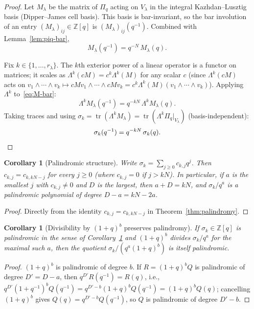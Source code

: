 \documentclass[11pt]{article}
\newtheorem{corollary}[theorem]{Corollary}
\theoremstyle{definition}
\newcommand{\Pq}{\Pi_q}
\newcommand{\Z}{\mathbb{Z}}
\newcommand{\tr}{\operatorname{tr}}
\begin{document}
\begin{proof}
Let $M_\lambda$ be the matrix of $\Pq$ acting on $V_\lambda$ in the
integral Kazhdan--Lusztig basis (Dipper--James cell basis). This basis
is bar-invariant, so the bar involution of an entry
$(M_\lambda)_{ij}\in\Z[q]$ is $(M_\lambda)_{ij}(q^{-1})$. Combined with
Lemma~\ref{lem:piq-bar},
\begin{equation}\label{eq:M-bar}
  M_\lambda(q^{-1}) = q^{-N}\,M_\lambda(q).
\end{equation}

Fix $k\in\{1,\ldots,r_\lambda\}$. The $k$th exterior power of a linear
operator is a functor on matrices; it scales as
$\Lambda^k(cM)=c^k\Lambda^k(M)$ for any scalar $c$ (since
$\Lambda^k(cM)$ acts on $v_1\wedge\cdots\wedge v_k\mapsto
cMv_1\wedge\cdots\wedge cMv_k=c^k\Lambda^k(M)(v_1\wedge\cdots\wedge v_k)$).
Applying $\Lambda^k$ to~\eqref{eq:M-bar}:
\[
  \Lambda^k M_\lambda(q^{-1}) = q^{-kN}\,\Lambda^k M_\lambda(q).
\]
Taking traces and using
$\sigma_k=\tr(\Lambda^k M_\lambda)=\tr(\Lambda^k\Pq|_{V_\lambda})$
(basis-independent):
\[
  \sigma_k(q^{-1}) = q^{-kN}\,\sigma_k(q).\qedhere
\]
\end{proof}

\begin{corollary}[Palindromic structure]\label{cor:palstructure}
Write $\sigma_k=\sum_{j\ge 0}c_{k,j}q^j$. Then $c_{k,j}=c_{k,kN-j}$ for
every $j\ge 0$ (where $c_{k,j}=0$ if $j>kN$). In particular, if $a$ is
the smallest $j$ with $c_{k,j}\ne 0$ and $D$ is the largest, then
$a+D=kN$, and $\sigma_k/q^a$ is a palindromic polynomial of degree
$D-a=kN-2a$.
\end{corollary}
\begin{proof}
Directly from the identity $c_{k,j}=c_{k,kN-j}$ in
Theorem~\ref{thm:palindromy}.
\end{proof}

\begin{corollary}[Divisibility by $(1+q)^b$ preserves palindromy]\label{cor:palpres}
If $\sigma_k\in\Z[q]$ is palindromic in the sense of
Corollary~\ref{cor:palstructure} and $(1+q)^b$ divides $\sigma_k/q^a$
for the maximal such $a$, then the quotient
$\sigma_k/(q^a(1+q)^b)$ is itself palindromic.
\end{corollary}
\begin{proof}
$(1+q)^b$ is palindromic of degree $b$. If $R=(1+q)^bQ$ is palindromic
of degree $D'=D-a$, then $q^{D'}R(q^{-1})=R(q)$, i.e.,
$q^{D'}(1+q^{-1})^bQ(q^{-1})=q^{D'-b}(1+q)^bQ(q^{-1})=(1+q)^bQ(q)$;
cancelling $(1+q)^b$ gives $Q(q)=q^{D'-b}Q(q^{-1})$, so $Q$ is
palindromic of degree $D'-b$.
\end{proof}
\end{document}
